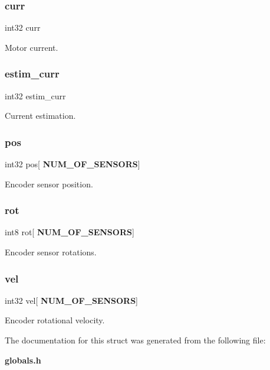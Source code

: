 \subsubsection{curr}
{\footnotesize\ttfamily int32 curr}

Motor current. \mbox{\label{structst__meas_a9d427d34982a34de7c1b8be206c2e740}} 
\subsubsection{estim\+\_\+curr}
{\footnotesize\ttfamily int32 estim\+\_\+curr}

Current estimation. \mbox{\label{structst__meas_a3ee4913e7257d25d3e47cbbada9c8546}} 
\subsubsection{pos}
{\footnotesize\ttfamily int32 pos[\textbf{ N\+U\+M\+\_\+\+O\+F\+\_\+\+S\+E\+N\+S\+O\+RS}]}

Encoder sensor position. \mbox{\label{structst__meas_a26b47db1884c475bc42d76a709349f97}} 
\subsubsection{rot}
{\footnotesize\ttfamily int8 rot[\textbf{ N\+U\+M\+\_\+\+O\+F\+\_\+\+S\+E\+N\+S\+O\+RS}]}

Encoder sensor rotations. \mbox{\label{structst__meas_a8ef1e0e837efdf852aa286d20625d6a1}} 
\subsubsection{vel}
{\footnotesize\ttfamily int32 vel[\textbf{ N\+U\+M\+\_\+\+O\+F\+\_\+\+S\+E\+N\+S\+O\+RS}]}

Encoder rotational velocity. 

The documentation for this struct was generated from the following file\+:\begin{DoxyCompactItemize}
\item 
\textbf{ globals.\+h}\end{DoxyCompactItemize}
